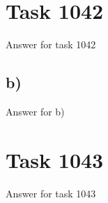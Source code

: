 \documentclass[12pt]{article} %
\begin{document}



\section*{Task 1042} %

Answer for task 1042

\subsection*{b)}

Answer for b)

\section*{Task 1043}

Answer for task 1043

\end{document}
